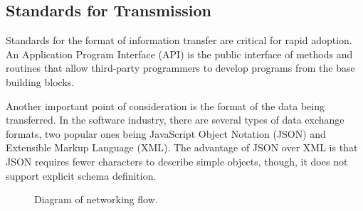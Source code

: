 \subsection{Standards for Transmission}

Standards for the format of information transfer are critical for rapid
adoption. An Application  Program Interface (API) is the public
interface of methods and routines that allow third-party programmers to
develop programs from the base building blocks. 

Another important point of consideration is the format of the data being
transferred. In the software industry, there are several types of data
exchange formats, two popular ones being JavaScript Object Notation
(JSON) and Extensible Markup Language (XML). The advantage of JSON over
XML is that JSON requires fewer characters to describe simple objects,
though, it does not support explicit schema definition. 

\begin{figure}
\caption{Diagram of networking flow.}
\label{fig:NetworkFlow}
\end{figure}


